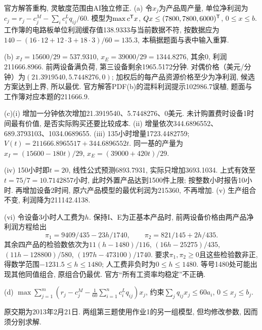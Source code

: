 \begin{solution}
官方解答重构, 灵敏度范围由AI独立修正. (a) 令$x_j$为产品周产量, 单位净利润为$c_j=r_j-c_j^M-\sum_i c_i^Lq_{ij}/60$. 模型为$\max c^{\mathsf T} x$, $Qx\le(7800,7800,6000)^{\mathsf T}$, $0\le x\le b$. 工作簿的电路板单位利润缓存值138.9333与当前数据不符, 按数据应为$140-(16\cdot12+12\cdot3+18\cdot3)/60=135.3$, 本稿据题面与表中输入重算.

(b) $x_I=15600/29=537.9310$, $x_E=39000/29=1344.8276$, 其余0, 利润211666.8966. 前两设备满负荷, 第三设备剩余1965.5172分钟. 对偶价格（美元/分钟）为$(21.3919540,5.7448276,0)$; 加权后的每产品资源价格至少为净利润, 候选方案达到上界, 所以最优. 官方解答PDF(b)的混料利润提示102986.7误植, 题面与工作簿对应本题的211666.9.

(c)(i) 增加一分钟依次增加21.3919540、5.7448276、0美元. 未计购置费时设备1时间最有价值, 是否实际购买还要比较成本. (ii) 增量依次344.6896552、689.3793103、1034.0689655. (iii) 135小时增量1723.4482759; $V(t)=211666.8965517+344.6896552t$. 同一基的产量为$x_I=(15600-180t)/29$, $x_E=(39000+420t)/29$.

(iv) 150小时即$t=20$, 线性公式预测6893.7931, 实际只增加3693.1034. 上式有效至$t=75/7=10.7142857$小时, 此时外置产品达到1500件上限; 按整数小时报告10小时. 再增加设备2时间, 原六产品模型的最优利润为215360, 不再增加. (v) 生产组合不变, 利润降为211142.4138.

(vi) 令设备3小时人工费为$h$. 保持I、E为正基本产品时, 前两设备价格由两产品净利润方程给出
\[
\pi_1=9409/435-23h/1740,\qquad \pi_2=821/145+2h/435.
\]
其余四产品的检验数依次为$11(h-1480)/116$, $(16h-25275)/435$, $(11h-128800)/580$, $(197h-473100)/1740$. 要求$\pi_1,\pi_2\ge0$且这些检验数非正, 得数学范围$-1231.5\le h\le1480$; 人工费非负时为$0\le h\le1480$. 等号1480处可能出现其他同值组合, 原组合仍最优. 官方“所有工资率均稳定”不正确.

(d) $\max\sum_{j=1}^m(r_j-c_j^M-\frac1{60}\sum_{i=1}^nc_i^Lq_{ij})x_j$, 约束$\sum_jq_{ij}x_j\le60a_i$, $0\le x_j\le b_j$.
\end{solution}

原交期为2013年2月21日. 两组第三题使用作业1的另一组模型, 但均修改参数, 因而须分别求解.


